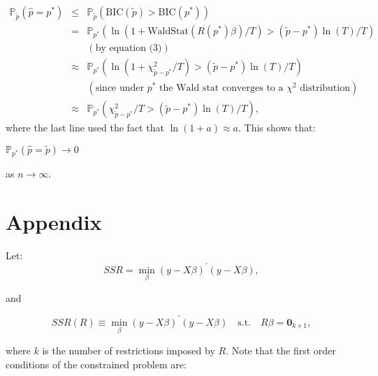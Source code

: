 \documentclass[12] {article}
\begin{document}
\begin{eqnarray*}
\mathbb{P}_{\tilde{p}}(\widehat{p} = p^*) &\leq& \mathbb{P}_{\tilde{p}}(\textrm{BIC}(\tilde{p}) > \textrm{BIC}(p^*)) \\
&=& \mathbb{P}_{p^*}(\ln (1+ \textrm{WaldStat} (R(p^*)\beta)/T)  > (\tilde{p}-p^*)\ln(T)/T) \\
&& (\textrm{by equation (3)}) \\
&\approx& \mathbb{P}_{p^*}(\ln (1+ \chi^2_{\tilde{p}-p^*}/T)  > (\tilde{p}-p^*)\ln(T)/T) \\
&& (\textrm{since under $p^*$ the Wald stat converges to a $\chi^2$ distribution}) \\
&\approx&  \mathbb{P}_{p^*}( \chi^2_{\tilde{p}-p^*}/T  > (\tilde{p}-p^*)\ln(T)/T),
\end{eqnarray*}
where the last line used the fact that $\ln(1+a) \approx a$. This shows that:

$\mathbb{P}_{p^*}(\widehat{p} = \tilde{p})  \rightarrow 0 $

\noindent as $n \rightarrow \infty$. 


\newpage


\newpage



\section{Appendix} 
Let:
\[ SSR = \min_{\beta} (y-X \beta)^{\prime} (y-X \beta), \]

\noindent and

\[ SSR(R) \equiv \min_{\beta} (y-X \beta)^{\prime} (y-X \beta) \quad \textrm{s.t.}\quad  R \beta = \textbf{0}_{k \times 1},  \]

\noindent where $k$ is the number of restrictions imposed by $R$. Note that the first order conditions of the constrained problem are:
\end{document}
